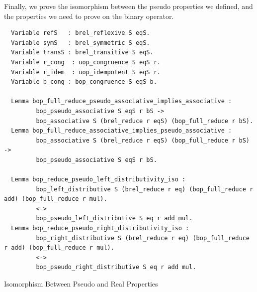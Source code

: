 \documentclass[a4paper,12pt,twoside,openright]{report}
\begin{document}
Finally, we prove the isomorphism between the pseudo properties we defined, and the properties we need to prove on the binary operator.
\begin{listing}[H]
\begin{verbatim}
  Variable refS   : brel_reflexive S eqS. 
  Variable symS   : brel_symmetric S eqS. 
  Variable transS : brel_transitive S eqS.
  Variable r_cong  : uop_congruence S eqS r. 
  Variable r_idem  : uop_idempotent S eqS r.
  Variable b_cong : bop_congruence S eqS b.                                                                                                                                                    
  
  Lemma bop_full_reduce_pseudo_associative_implies_associative : 
         bop_pseudo_associative S eqS r bS -> 
         bop_associative S (brel_reduce r eqS) (bop_full_reduce r bS). 
  Lemma bop_full_reduce_associative_implies_pseudo_associative :
         bop_associative S (brel_reduce r eqS) (bop_full_reduce r bS) ->
         bop_pseudo_associative S eqS r bS. 
         
  Lemma bop_reduce_pseudo_left_distributivity_iso :
         bop_left_distributive S (brel_reduce r eq) (bop_full_reduce r add) (bop_full_reduce r mul).
         <->
         bop_pseudo_left_distributive S eq r add mul.
  Lemma bop_reduce_pseudo_right_distributivity_iso :
         bop_right_distributive S (brel_reduce r eq) (bop_full_reduce r add) (bop_full_reduce r mul).
         <->
         bop_pseudo_right_distributive S eq r add mul.
\end{verbatim}
\caption{Isomorphism Between Pseudo and Real Properties} 
\label{coq:proof:pseudo_iso}
\end{listing}
\end{document}
